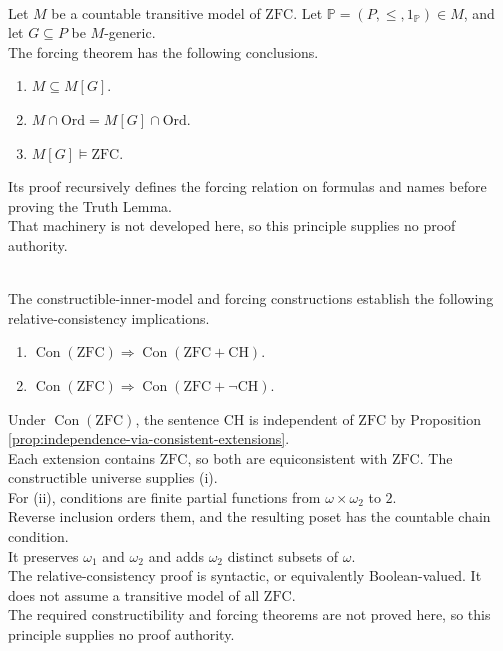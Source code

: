 \begin{principle} \label{princ:forcing-extension-preview} \\
Let $M$ be a countable transitive model of $\mathrm{ZFC}$. Let $\mathbb{P}=(P,\leq,1_{\mathbb{P}})\in M$, and let $G\subseteq P$ be $M$-generic.\\
The forcing theorem has the following conclusions.
\begin{enumerate}[label=(\roman*)]
\setlength{\itemsep}{0pt}
\item $M\subseteq M[G]$.
\item $M\cap\mathrm{Ord}=M[G]\cap\mathrm{Ord}$.
\item $M[G]\models\mathrm{ZFC}$.
\end{enumerate}
Its proof recursively defines the forcing relation on formulas and names before proving the Truth Lemma.\\
That machinery is not developed here, so this principle supplies no proof authority.
\end{principle}

\begin{principle} \label{princ:continuum-hypothesis-relative-consistency} \\
The constructible-inner-model and forcing constructions establish the following relative-consistency implications.
\begin{enumerate}[label=(\roman*)]
\setlength{\itemsep}{0pt}
\item $\operatorname{Con}(\mathrm{ZFC})\Longrightarrow\operatorname{Con}(\mathrm{ZFC}+\mathrm{CH})$.
\item $\operatorname{Con}(\mathrm{ZFC})\Longrightarrow\operatorname{Con}(\mathrm{ZFC}+\neg\mathrm{CH})$.
\end{enumerate}
Under $\operatorname{Con}(\mathrm{ZFC})$, the sentence $\mathrm{CH}$ is independent of $\mathrm{ZFC}$ by Proposition \ref{prop:independence-via-consistent-extensions}.\\
Each extension contains $\mathrm{ZFC}$, so both are equiconsistent with $\mathrm{ZFC}$. The constructible universe supplies (i).\\
For (ii), conditions are finite partial functions from $\omega\times\omega_2$ to $2$.\\
Reverse inclusion orders them, and the resulting poset has the countable chain condition.\\
It preserves $\omega_1$ and $\omega_2$ and adds $\omega_2$ distinct subsets of $\omega$.\\
The relative-consistency proof is syntactic, or equivalently Boolean-valued. It does not assume a transitive model of all $\mathrm{ZFC}$.\\
The required constructibility and forcing theorems are not proved here, so this principle supplies no proof authority.
\end{principle}
